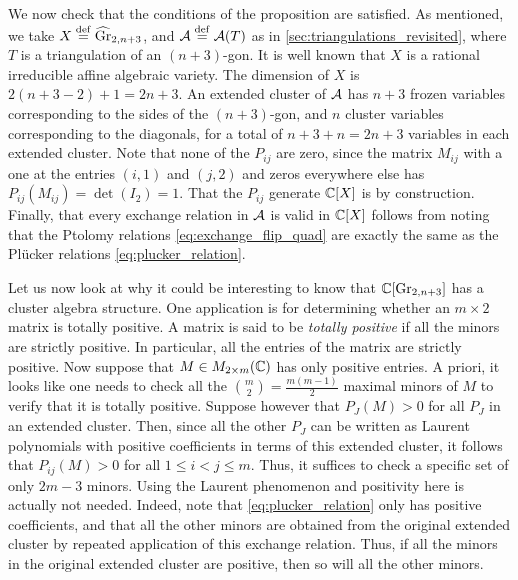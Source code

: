 We now check that the conditions of the proposition are satisfied. As mentioned, we
take $X \overset{\mathrm{def}}{=} \widehat{\operatorname{Gr}}_{2, n+3}$, and $\mathcal{A} \overset{\mathrm{def}}{=} \mathcal{A}(T)$ as in
\cref{sec:triangulations_revisited}, where $T$ is a triangulation of an $(n+3)$-gon. It
is well known \cite[Proposition 12.7]{FominZelevinsky2003CAFin} that $X$ is a rational
irreducible affine algebraic variety. The dimension of $X$ is $2 (n+3 - 2) + 1 = 2n
	+3$. An extended cluster of $\mathcal{A}$ has $n+3$ frozen variables corresponding to the
sides of the $(n+3)$-gon, and $n$ cluster variables corresponding to the diagonals, for
a total of $n+3 + n = 2n +3$ variables in each extended cluster. Note that none of the
$P_{ij}$ are zero, since the matrix $M_{ij}$ with a one at the entries $(i,1)$ and
$(j,2)$ and zeros everywhere else has $P_{ij}(M_{ij}) = \det(I_2) = 1$. That the
$P_{ij}$ generate $\mathbb{C}[X]$ is by construction. Finally, that every exchange relation
in $\mathcal{A}$ is valid in $\mathbb{C}[X]$ follows from noting that the Ptolomy relations
\cref{eq:exchange_flip_quad} are exactly the same as the Plücker relations
\cref{eq:plucker_relation}.

\medskip

Let us now look at why it could be interesting to know that $\mathbb{C}[\operatorname{Gr}_{2, n+3}]$ has a
cluster algebra structure. One application is for determining whether an $m \times 2$
matrix is totally positive. A matrix is said to be \emph{totally
	positive} if all the minors are strictly positive. In
particular, all the entries of the matrix are strictly positive. Now suppose that $M
	\in M_{2 \times m}(\mathbb{C})$ has only positive entries. A priori, it looks like one needs
to check all the $\binom{m}{2} = \frac{m(m-1)}{2}$ maximal minors of $M$ to verify that
it is totally positive. Suppose however that $P_J(M) > 0$ for all $P_J$ in an extended
cluster. Then, since all the other $P_J$ can be written as Laurent polynomials with
positive coefficients in terms of this extended cluster, it follows that $P_{ij}(M) >
	0$ for all $1 \leq i < j \leq m$. Thus, it suffices to check a specific set of only $2m
	- 3$ minors. Using the Laurent phenomenon and positivity here is actually not needed.
Indeed, note that \cref{eq:plucker_relation} only has positive coefficients, and that
all the other minors are obtained from the original extended cluster by repeated
application of this exchange relation. Thus, if all the minors in the original extended
cluster are positive, then so will all the other minors.

